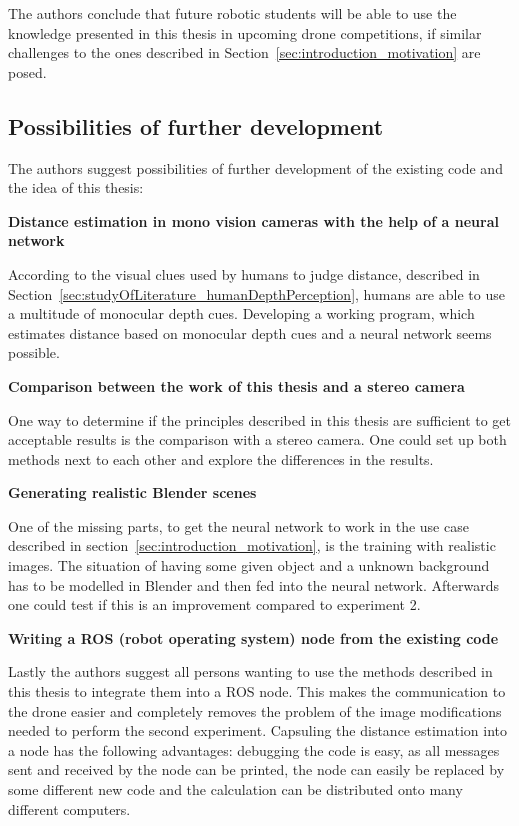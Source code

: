 The authors conclude that future robotic students will be able to use the knowledge presented in this thesis in upcoming drone competitions, if similar challenges to the ones described in Section~\ref{sec:introduction_motivation} are posed.

\subsection{Possibilities of further development}

The authors suggest possibilities of further development of the existing code and the idea of this thesis:

\textbf{Distance estimation in mono vision cameras with the help of a neural network}

According to the visual clues used by humans to judge distance, described in Section~\ref{sec:studyOfLiterature_humanDepthPerception}, humans are able to use a multitude of monocular depth cues. Developing a working program, which estimates distance based on monocular depth cues and a neural network seems possible.

\textbf{Comparison between the work of this thesis and a stereo camera}

One way to determine if the principles described in this thesis are sufficient to get acceptable results is the comparison with a stereo camera. One could set up both methods next to each other and explore the differences in the results.

\textbf{Generating realistic Blender scenes}

One of the missing parts, to get the neural network to work in the use case described in section~\ref{sec:introduction_motivation}, is the training with realistic images. The situation of having some given object and a unknown background has to be modelled in Blender and then fed into the neural network. Afterwards one could test if this is an improvement compared to experiment 2.

\textbf{Writing a ROS (robot operating system) node from the existing code}

Lastly the authors suggest all persons wanting to use the methods described in this thesis to integrate them into a ROS node. This makes the communication to the drone easier and completely removes the problem of the image modifications needed to perform the second experiment. Capsuling the distance estimation into a node has the following advantages: debugging the code is easy, as all messages sent and received by the node can be printed, the node can easily be replaced by some different new code and the calculation can be distributed onto many different computers.

